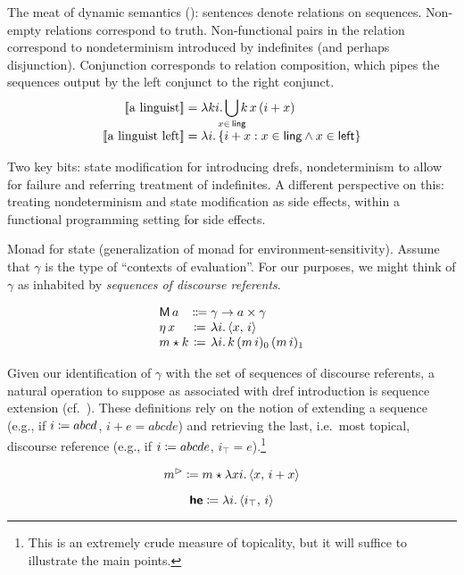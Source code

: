 	The meat of dynamic semantics (\citealt{Heim:1982, Kamp:1981, GroenendijkStokhof:1991, Dekker:1994}): sentences denote relations on sequences. Non-empty relations correspond to truth. Non-functional pairs in the relation correspond to nondeterminism introduced by indefinites (and perhaps disjunction). Conjunction corresponds to relation composition, which pipes the sequences output by the left conjunct to the right conjunct.%
	\[\begin{array}{r@{}l}
		\sv{\text{a linguist}} &{}= \lambda ki.\displaystyle\bigcup_{\mathclap{x\in\,\textsf{ling}}}k\,x\,(i + x)%
		\\
		\sv{\text{a linguist left}} &{}= \lambda i.\,\{i + x : x \in \textsf{ling} \wedge x \in \textsf{left}\}%
	\end{array}\]%

	Two key bits: state modification for introducing drefs, nondeterminism to allow for failure and referring treatment of indefinites. A different perspective on this: treating nondeterminism and state modification as side effects, within a functional programming setting for side effects. %
	
	Monad for state (generalization of monad for environment-sensitivity). Assume that $\gamma$ is the type of ``contexts of evaluation''. For our purposes, we might think of $\gamma$ as inhabited by \emph{sequences of discourse referents}.%
	\begin{defi}\label{state}
		\[\begin{array}[t]
			{@{}l@{}c@{}l@{}}
			\textsf{M}\,a &{}\Coloneqq{} &\gamma \ra a \times \gamma	%
			\\
			\eta\,x &{}\ceq{} &\lambda i.\,\ab{x,\,i}
			\\
			m \star k &{}\ceq{} &\lambda i.\,k\,(m\,i)_0\,(m\,i)_1%
		\end{array}\]
	\end{defi}
	
	Given our identification of $\gamma$ with the set of sequences of discourse referents, a natural operation to suppose as associated with dref introduction is sequence extension (cf.~\citealt{Groote:2006, Unger:2012, Charlow:diss}). These definitions rely on the notion of extending a sequence (e.g., if $i \coloneqq abcd$, $i+e = abcde$) and retrieving the last, i.e.~most topical, discourse reference (e.g., if $i \coloneqq abcde$, $i_\top = e$).\footnote{This is an extremely crude measure of topicality, but it will suffice to illustrate the main points.}%
	\begin{defi}
		\[m^\rhd \coloneqq m \star \lambda xi.\,\langle x,\,i + x \rangle\]
	\end{defi}
	\begin{defi}
		\[\textbf{\textsf{he}} \coloneqq \lambda i.\,\langle i_\top,\,i \rangle\]
	\end{defi}
	

